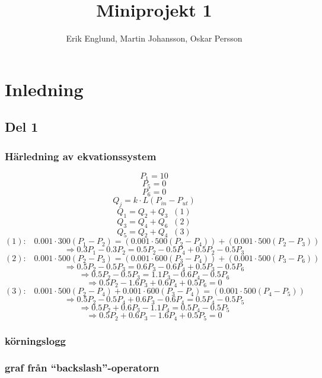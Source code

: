 \documentclass[12pt, a4paper]{report}
\title{Miniprojekt 1}
\author{Erik Englund, Martin Johansson, Oskar Persson}
\begin{document}
\maketitle
\chapter{Inledning}
\section{Del 1}
\subsection{Härledning av ekvationssystem}

$$P_1 = 10$$
$$P_5 = 0$$
$$P_6 = 0$$
$$Q_j = k \cdot L(P_{in} - P_{ut})$$
$$Q_1 = Q_2 + Q_3\;\;(1)$$
$$Q_3 = Q_4 + Q_6\;\;(2)$$
$$Q_5 = Q_2 + Q_4\;\;(3)$$
\newline
$(1):\;\;\; 0.001\cdot300(P_1-P_2)=(0.001\cdot500(P_2-P_4))+(0.001\cdot500(P_2-P_3))$
$$\Rightarrow0.3P_1-0.3P_2=0.5P_2-0.5P_4+0.5P_2-0.5P_3$$
\newline
$(2):\;\;\; 0.001\cdot500(P_2-P_3)=(0.001\cdot600(P_3-P_4))+(0.001\cdot500(P_3-P_6))$
$$\Rightarrow0.5P_2-0.5P_3=0.6P_3-0.6P_4+0.5P_3-0.5P_6$$
$$\Rightarrow0.5P_2-0.5P_3=1.1P_3-0.6P_4-0.5P_6$$
$$\Rightarrow0.5P_2-1.6P_3+0.6P_4+0.5P_6=0$$
\newline
$(3):\;\;\; 0.001\cdot500(P_2-P_4)+0.001\cdot600(P_3-P_4)=(0.001\cdot500(P_4-P_5))$
$$\Rightarrow0.5P_2-0.5P_4+0.6P_3-0.6P_4=0.5P_4-0.5P_5$$
$$\Rightarrow0.5P_2+0.6P_3-1.1P_4=0.5P_4-0.5P_5$$
$$\Rightarrow0.5P_2+0.6P_3-1.6P_4+0.5P_5=0$$

\subsection{körningslogg}

\subsection{graf från ``backslash''-operatorn}
\end{document}
